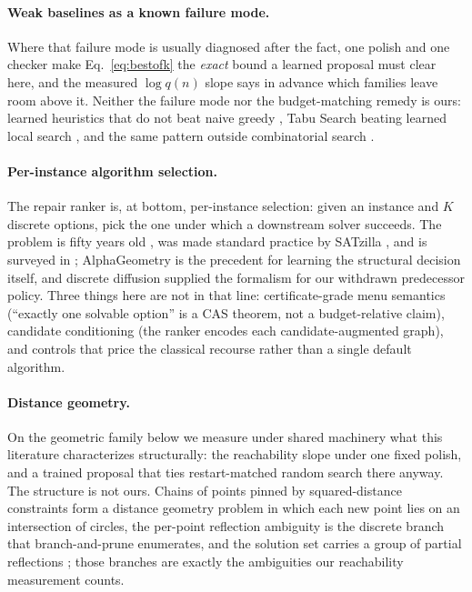\documentclass[letterpaper]{article} %
\begin{document}
\paragraph{Weak baselines as a known failure mode.}
Where that failure mode is usually diagnosed after the fact, one polish and one checker make
Eq.~\eqref{eq:bestofk} the \emph{exact} bound a learned proposal must clear here, and the
measured $\log q(n)$ slope says in advance which families leave room above it. Neither the
failure mode nor the budget-matching remedy is ours: learned heuristics that do not beat
naive greedy \citep{nath2024maxcutbenchmark}, Tabu Search beating learned local search
\citep{nath2023mightiest}, and the same pattern outside combinatorial search
\citep{rodrigues2026budgetmatched}.

\paragraph{Per-instance algorithm selection.}
The repair ranker is, at bottom, per-instance selection: given an
instance and $K$ discrete options, pick the one under which a downstream solver succeeds.
The problem is fifty years old \citep{rice1976algorithm}, was made standard practice by
SATzilla \citep{xu2008satzilla}, and is surveyed in \citet{kerschke2019survey}; AlphaGeometry
\citep{trinh2024alphageometry} is the precedent for learning
the structural decision itself, and discrete diffusion \citep{austin2021d3pm,
vignac2023digress} supplied the formalism for our withdrawn predecessor policy. Three things here are not in that line: certificate-grade menu semantics (``exactly one
solvable option'' is a CAS theorem, not a budget-relative claim), candidate conditioning (the ranker encodes each
candidate-augmented graph), and controls that price the classical recourse rather than a
single default algorithm.

\paragraph{Distance geometry.}
On the geometric family below we measure under shared machinery what this literature
characterizes structurally: the reachability slope under one fixed polish, and a trained
proposal that ties restart-matched random search there anyway. The structure is not ours.
Chains of points pinned by squared-distance constraints form a distance geometry problem in
which each new point lies on an intersection of circles, the per-point reflection ambiguity is
the discrete branch that branch-and-prune enumerates, and the solution set carries a group of
partial reflections \citep{lavor2012dmdgp, liberti2014distance}; those branches are exactly
the ambiguities our reachability measurement counts.
\end{document}
